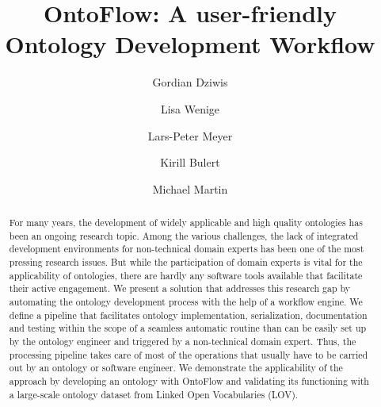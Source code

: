 \documentclass[runningheads]{llncs}
\begin{document}
\title{OntoFlow: A user-friendly Ontology Development Workflow}

\author{Gordian Dziwis \and Lisa Wenige \and Lars-Peter Meyer \and Kirill Bulert \and Michael Martin}

%

\maketitle

\begin{abstract}
  For many years, the development of widely applicable and high quality ontologies has been an ongoing research topic. Among the various challenges, the lack of integrated development environments for non-technical domain experts has been one of the most pressing research issues. But while the participation of domain experts is vital for the applicability of ontologies, there are hardly any software tools available that facilitate their active engagement. We present a solution that addresses this research gap by automating the ontology development process with the help of a workflow engine. We define a pipeline that facilitates ontology implementation, serialization, documentation and testing within the scope of a seamless automatic routine than can be easily set up by the ontology engineer and triggered by a non-technical domain expert. Thus, the processing pipeline takes care of most of the operations that usually have to be carried out by an ontology or software engineer. We demonstrate the applicability of the approach by developing an ontology with OntoFlow and validating its functioning with a large-scale ontology dataset from Linked Open Vocabularies (LOV).
\end{abstract}
\end{document}
